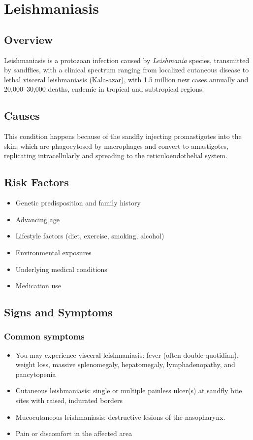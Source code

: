 \chapter{Leishmaniasis}
\label{sec:Leishmaniasis}

\section{Overview}
Leishmaniasis is a protozoan infection caused by \textit{Leishmania} species, transmitted by sandflies, with a clinical spectrum ranging from localized cutaneous disease to lethal visceral leishmaniasis (Kala-azar), with 1.5 million new cases annually and 20,000--30,000 deaths, endemic in tropical and subtropical regions.
\section{Causes}
This condition happens because of the sandfly injecting promastigotes into the skin, which are phagocytosed by macrophages and convert to amastigotes, replicating intracellularly and spreading to the reticuloendothelial system.     
\section{Risk Factors}

\begin{itemize}[noitemsep]
  \item Genetic predisposition and family history
  \item Advancing age
  \item Lifestyle factors (diet, exercise, smoking, alcohol)
  \item Environmental exposures
  \item Underlying medical conditions
  \item Medication use
\end{itemize}
\section{Signs and Symptoms}

\subsection{Common symptoms}
\begin{itemize}[noitemsep]
  \item You may experience visceral leishmaniasis: fever (often double quotidian), weight loss, massive splenomegaly, hepatomegaly, lymphadenopathy, and pancytopenia
  \item Cutaneous leishmaniasis: single or multiple painless ulcer(s) at sandfly bite sites with raised, indurated borders
  \item Mucocutaneous leishmaniasis: destructive lesions of the nasopharynx.
  \item Pain or discomfort in the affected area
  \end{itemize}

